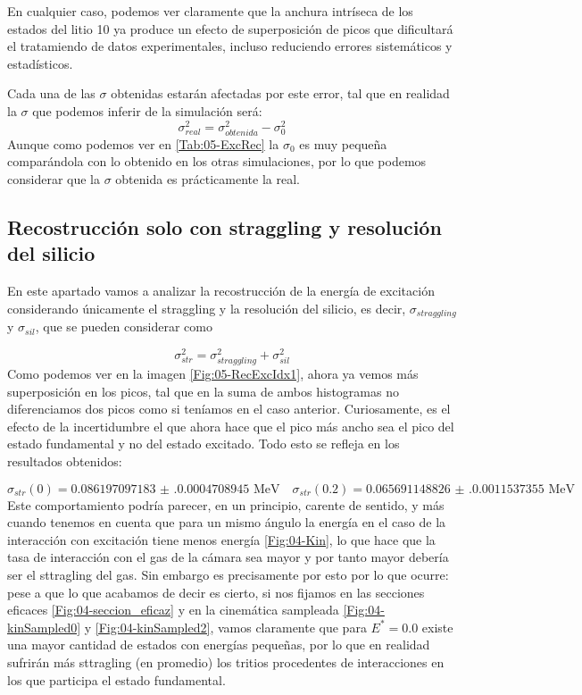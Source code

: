 En cualquier caso, podemos ver claramente que la anchura intríseca de los estados del litio 10 ya produce un efecto de superposición de picos que dificultará el tratamiendo de datos experimentales, incluso reduciendo errores sistemáticos y estadísticos.

Cada una de las $\sigma$ obtenidas estarán afectadas por este error, tal que en realidad la $\sigma$ que podemos inferir de la simulación será:
\begin{equation}
    \sigma_{real}^2 = \sigma_{obtenida}^2 - \sigma_{0}^2
\end{equation}
Aunque como podemos ver en  \cref{Tab:05-ExcRec} la $\sigma_{0}$ es muy pequeña comparándola con lo obtenido en los otras simulaciones, por lo que podemos considerar que la $\sigma$ obtenida es prácticamente la real. 



\subsection{Recostrucción solo con straggling y resolución del silicio}

En este apartado vamos a analizar la recostrucción de la energía de excitación considerando únicamente el straggling y la resolución del silicio, es decir, $\sigma_{straggling}$ y $\sigma_{sil}$, que se pueden considerar como

\begin{equation}
    \sigma_{str}^2 = \sigma_{straggling}^2 + \sigma_{sil}^2
\end{equation}
Como podemos ver en la imagen \cref{Fig:05-RecExcIdx1}, ahora ya vemos más superposición en los picos, tal que en la suma de ambos histogramas no diferenciamos dos picos como si teníamos en el caso anterior. Curiosamente, es el efecto de la incertidumbre el que ahora hace que el pico más ancho sea el pico del estado fundamental y no del estado excitado. Todo esto se refleja en los resultados obtenidos: 

\begin{equation}
    \sigma_{str} (0) = \num{0.086197097183(0.0004708945)} \text{ MeV} \quad 
    \sigma_{str} (0.2) = \num{0.065691148826(0.0011537355)} \text{ MeV}
\end{equation} 
Este comportamiento podría parecer, en un principio, carente de sentido, y más cuando tenemos en cuenta que para un mismo ángulo la energía en el caso de la interacción con excitación tiene menos energía \cref{Fig:04-Kin}, lo que hace que la tasa de interacción con el gas de la cámara sea mayor y por tanto mayor debería ser el sttragling del gas. Sin embargo es precisamente por esto por lo que ocurre: pese a que lo que acabamos de decir es cierto, si nos fijamos en las secciones eficaces \cref{Fig:04-seccion_eficaz} y en la cinemática sampleada \cref{Fig:04-kinSampled0} y \cref{Fig:04-kinSampled2}, vamos claramente que para $E^*=0.0$ existe una mayor cantidad de estados con energías pequeñas, por lo que en realidad sufrirán más sttragling (en promedio) los tritios procedentes de interacciones en los que participa el estado fundamental. 


